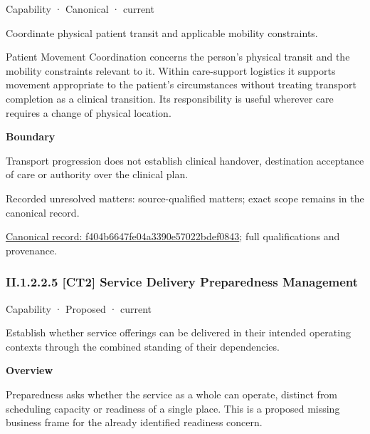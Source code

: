 \label{element:f404b6647fe04a3390e57022bdef0843}
{\small Capability · Canonical · current}\par

Coordinate physical patient transit and applicable mobility constraints.



Patient Movement Coordination concerns the person's physical transit and the mobility constraints relevant to it. Within care-support logistics it supports movement appropriate to the patient's circumstances without treating transport completion as a clinical transition. Its responsibility is useful wherever care requires a change of physical location.



\textbf{Boundary}



Transport progression does not establish clinical handover, destination acceptance of care or authority over the clinical plan.


{\small Recorded unresolved matters: source-qualified matters; exact scope remains in the canonical record.}\par
{\footnotesize \href{../../../../continuum/strategy/capability/f404b6647fe04a3390e57022bdef0843.md}{Canonical record: f404b6647fe04a3390e57022bdef0843}; full qualifications and provenance.}\par
\subsubsection*{II.1.2.2.5 [CT2] Service Delivery Preparedness Management}
\label{navigation:II.1.2.2.5}

\label{element:9665d894c4c9438999d8cc10afae695d}
{\small Capability · Proposed · current}\par

Establish whether service offerings can be delivered in their intended operating contexts through the combined standing of their dependencies.



\textbf{Overview}



Preparedness asks whether the service as a whole can operate, distinct from scheduling capacity or readiness of a single place. This is a proposed missing business frame for the already identified readiness concern.



